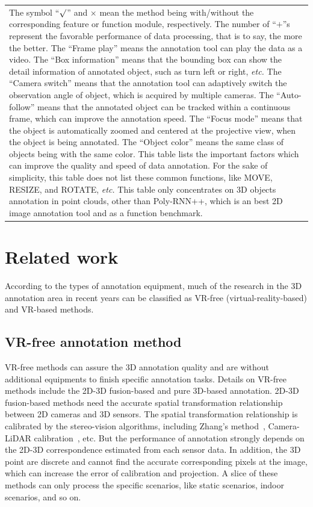 \documentclass[letterpaper, 10 pt, conference]{ieeeconf}  %
\begin{document}
\begin{table}[]
\begin{tabular}{p{17cm}}
		The symbol ``$\surd$'' and $\times$ mean the method being with/without the corresponding feature or function module, respectively. The number of ``$\textbf{+}$''s represent the favorable performance of data processing, that is to say, the more the better. The ``Frame play'' means the annotation tool can play the data as a video. The ``Box information'' means that the bounding box can show the detail information of annotated object, such as turn left or right, \textit{etc.} The ``Camera switch''  means that the annotation tool can adaptively switch the observation angle of object, which is acquired by multiple cameras. The ``Auto-follow'' means that the annotated object can be tracked within a continuous frame, which can improve the annotation speed. The ``Focus mode''  means that the object is automatically zoomed and centered at the projective view, when the object is being annotated. The ``Object color''  means the same class of objects being with the same color. This table lists the important factors which can improve the quality and speed of data annotation. For the sake of simplicity, this table does not list these common functions, like MOVE, RESIZE, and ROTATE, \textit{etc.} This table only concentrates on 3D objects annotation in point clouds, other than Poly-RNN++, which is an best 2D image annotation tool and as a function benchmark.
	\end{tabular}
	\label{tab:expanda}
	\vspace{-0.5cm}
\end{table}


\section{Related work}
\label{Realtedwork}
According to the types of annotation equipment, much of the research in the 3D annotation area in recent years can be classified as VR-free (virtual-reality-based) and VR-based methods.
\subsection{VR-free annotation method}
VR-free methods can assure the 3D annotation quality  and are without additional equipments to finish specific annotation tasks.
Details on VR-free methods include the 2D-3D fusion-based and pure 3D-based annotation.
2D-3D fusion-based methods need the accurate spatial transformation relationship between 2D cameras and 3D sensors.
The spatial transformation relationship is calibrated by the stereo-vision algorithms, including Zhang's method~\cite{zhangzhegnyou}, Camera-LiDAR calibration~\cite{roadCalibration}, etc.
But the performance of annotation strongly depends on the 2D-3D correspondence estimated from each sensor data. In addition, the 3D point are discrete and cannot find the accurate corresponding pixels at the image, which can increase the error of calibration and projection. A slice of these methods can only process the specific scenarios, like static scenarios, indoor scenarios, and so on.
\end{document}
